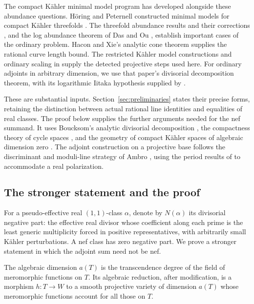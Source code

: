 The compact K\"ahler minimal model program has developed alongside
these abundance questions. H\"oring and Peternell constructed minimal
models for compact K\"ahler threefolds \cite{HoeringPeternell2016}.
The threefold abundance results and their corrections
\cite{CHP2016,CHP2023}, and the log abundance theorem of Das and Ou
\cite{DasOu2024,DasOu2026}, establish important cases of the ordinary problem.
Hacon and Xie's analytic cone theorem \cite{HX} supplies the rational
curve length bound. The restricted K\"ahler model constructions and
ordinary scaling in \cite[Section~3]{K} supply the detected projective
steps used here. For ordinary adjoints in arbitrary dimension, we use
that paper's divisorial decomposition theorem, with its logarithmic
Iitaka hypothesis supplied by \cite{LI}.

These are substantial inputs. Section~\ref{sec:preliminaries} states
their precise forms, retaining the distinction between actual
rational line identities and equalities of real classes.
The proof below supplies the further arguments needed for the nef
summand. It uses Boucksom's analytic divisorial decomposition
\cite{Boucksom2004}, the compactness theory of cycle spaces
\cite{Barlet,LiebermanCycles,Fujiki}, and the geometry of compact K\"ahler
spaces of algebraic dimension zero
\cite{COP,BBYv2,Ou}. The adjoint construction on a projective base
follows the discriminant and moduli-line strategy of Ambro
\cite[Theorem~0.2]{Ambro}, using the period results of \cite{LI}
to accommodate a real polarization.

\subsection{The stronger statement and the proof}

For a pseudo-effective real \((1,1)\)-class \(\alpha\), denote by
\(N(\alpha)\) its divisorial negative part: the effective real divisor
whose coefficient along each prime is the least generic multiplicity
forced in positive representatives, with arbitrarily small K\"ahler
perturbations. A nef class has zero negative part.
We prove a stronger statement in which the adjoint sum need not be nef.

The algebraic dimension \(a(T)\) is the transcendence degree of the
field of meromorphic functions on \(T\). Its algebraic reduction,
after modification, is a morphism \(h:T\to W\) to a smooth projective
variety of dimension \(a(T)\) whose meromorphic functions account for
all those on \(T\).

